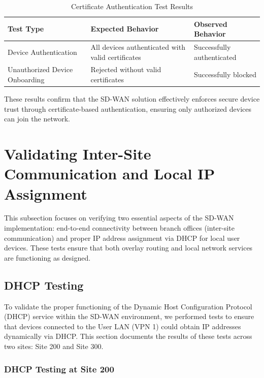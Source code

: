 \documentclass[12pt,english]{report}
\begin{document}
\begin{table}[h]
\centering
\footnotesize
\caption{Certificate Authentication Test Results}
\label{tab:certificate_auth_results}
\begin{tabularx}{\linewidth}{@{}>{\raggedright\arraybackslash}p{4.5cm}>{\raggedright\arraybackslash}p{5cm}>{\raggedright\arraybackslash}X@{}}
\toprule
\textbf{Test Type} & \textbf{Expected Behavior} & \textbf{Observed Behavior} \\
\midrule
Device Authentication & All devices authenticated with valid certificates & Successfully authenticated \\
\midrule
Unauthorized Device Onboarding & Rejected without valid certificates & Successfully blocked \\
\bottomrule
\end{tabularx}
\end{table}


These results confirm that the SD-WAN solution effectively enforces secure device trust through certificate-based authentication, ensuring only authorized devices can join the network.
\section{Validating Inter-Site Communication and Local IP Assignment}

This subsection focuses on verifying two essential aspects of the SD-WAN implementation: end-to-end connectivity between branch offices (inter-site communication) and proper IP address assignment via DHCP for local user devices. These tests ensure that both overlay routing and local network services are functioning as designed.

\subsection{DHCP Testing}

To validate the proper functioning of the Dynamic Host Configuration Protocol (DHCP) service within the SD-WAN environment, we performed tests to ensure that devices connected to the User LAN (VPN 1) could obtain IP addresses dynamically via DHCP. This section documents the results of these tests across two sites: Site 200 and Site 300.

\subsubsection{DHCP Testing at Site 200}
\end{document}

